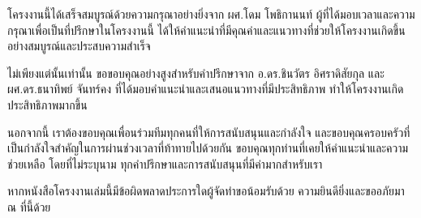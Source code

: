     \begin{acknowledgments}
        
        
        โครงงานนี้ได้เสร็จสมบูรณ์ด้วยความกรุณาอย่างยิ่งจาก ผศ.โดม โพธิกานนท์ ผู้ที่ได้มอบเวลาและความกรุณาเพื่อเป็นที่ปรึกษาในโครงงานนี้ ได้ให้คำแนะนำที่มีคุณค่าและแนวทางที่ช่วยให้โครงงานเกิดขึ้นอย่างสมบูรณ์และประสบความสำเร็จ
        
        ไม่เพียงแต่นั้นเท่านั้น ขอขอบคุณอย่างสูงสำหรับคำปรึกษาจาก อ.ดร.ชินวัตร อิศราดิสัยกุล และ ผศ.ดร.ธนาทิพย์ จันทร์คง ที่ได้มอบคำแนะนำและเสนอแนวทางที่มีประสิทธิภาพ ทำให้โครงงานเกิดประสิทธิภาพมากขึ้น
        
        นอกจากนี้ เราต้องขอบคุณเพื่อนร่วมทีมทุกคนที่ให้การสนับสนุนและกำลังใจ และขอบคุณครอบครัวที่เป็นกำลังใจสำคัญในการผ่านช่วงเวลาที่ท้าทายไปด้วยกัน ขอบคุณทุกท่านที่เคยให้คำแนะนำและความช่วยเหลือ โดยที่ไม่ระบุนาม ทุกคำปรึกษาและการสนับสนุนที่มีค่ามากสำหรับเรา
        
        หากหนังสือโครงงานเล่มนี้มีข้อผิดพลาดประการใดผู้จัดทําขอน้อมรับด้วย ความยินดียิ่งและขออภัยมา ณ ที่นี้ด้วย
    \end{acknowledgments}%
\fi %

\contentspage

\ifproject
    \figurelistpage

    \tablelistpage
\fi %



